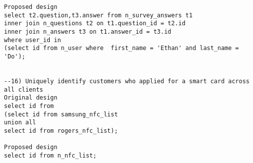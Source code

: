 \begin{lstlisting}
Proposed design
select t2.question,t3.answer from n_survey_answers t1
inner join n_questions t2 on t1.question_id = t2.id
inner join n_answers t3 on t1.answer_id = t3.id
where user_id in
(select id from n_user where  first_name = 'Ethan' and last_name = 'Do');


--16) Uniquely identify customers who applied for a smart card across all clients
Original design
select id from
(select id from samsung_nfc_list
union all
select id from rogers_nfc_list);

Proposed design
select id from n_nfc_list;

\end{lstlisting} 